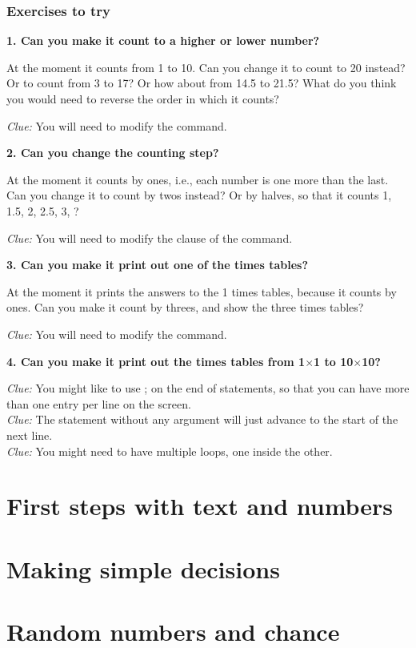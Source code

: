   
  \subsubsection{Exercises to try}

  {\bf 1. Can you make it count to a higher or lower number?}

  At the moment it counts from 1 to 10.  Can you change it to count to 20 instead?  Or to count from 3 to 17?
  Or how about from 14.5 to 21.5? What do you think you would need to reverse the order in which it counts?

  {\em Clue:} You will need to modify the  command.  

  {\bf 2. Can you change the counting step?}

  At the moment it counts by ones, i.e., each number is one more than the last.  Can you change it to count by twos
  instead? Or by halves, so that it counts 1, 1.5, 2, 2.5, 3, \ellipsis?
  
  {\em Clue:} You will need to modify the  clause of the  command.
  
  
  {\bf 3. Can you make it print out one of the times tables?}
  
  At the moment it prints the answers to the 1 times tables, because it counts by ones.
  Can you make it count by threes, and show the three times tables?
  
  {\em Clue:} You will need to modify the  command.
  
  {\bf 4. Can you make it print out the times tables from 1$\times$1 to 10$\times$10?}
  
  {\em Clue:} You might like to use ; on the end of  statements, so that you can have
  more than one entry per line on the screen.\\
  {\em Clue:} The  statement without any argument will just advance to the start of the next line.\\
  {\em Clue:} You might need to have multiple  loops, one inside the other.
  
\section{First steps with text and numbers}

\section{Making simple decisions}

\section{Random numbers and chance}
